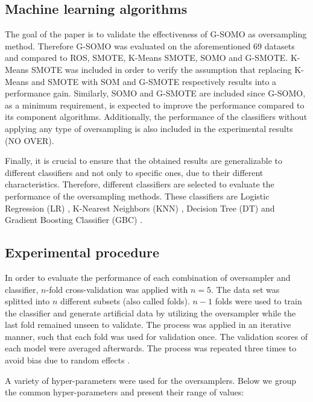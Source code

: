 \documentclass[parskip=full]{scrartcl}
\begin{document}
\subsection{Machine learning algorithms}

The goal of the paper is to validate the effectiveness of G-SOMO as oversampling method. Therefore G-SOMO was evaluated on the aforementioned 69 datasets and compared to ROS, SMOTE, K-Means SMOTE, SOMO and G-SMOTE. K-Means SMOTE was included in order to verify the assumption that replacing K-Means and SMOTE with SOM and G-SMOTE respectively results into a performance gain. Similarly, SOMO and G-SMOTE are included since G-SOMO, as a minimum requirement, is expected to improve the performance compared to its component algorithms. Additionally, the performance of the classifiers without applying any type of oversampling is also included in the experimental results (NO OVER).

Finally, it is crucial to ensure that the obtained results are generalizable to different classifiers and not only to specific ones, due to their different characteristics. Therefore, different classifiers are selected to evaluate the performance of the oversampling methods. These classifiers are Logistic Regression (LR) \cite{McCullagh1989}, K-Nearest Neighbors (KNN) \cite{Cover1967}, Decision Tree (DT) \cite{Salzberg1994} and Gradient Boosting Classifier (GBC) \cite{Friedman2001}.

\subsection{Experimental procedure}

In order to evaluate the performance of each combination of oversampler and classifier, $n$-fold cross-validation was applied with $n = 5$. The data set was splitted into $n$ different subsets (also called folds). $n-1$ folds were used to train the classifier and generate artificial data by utilizing the oversampler while the last fold remained unseen to validate. The process was applied in an iterative manner, such that each fold was used for validation once. The validation scores of each model were averaged afterwards. The process was repeated three times to avoid bias due to random effects \cite{Japkowicz2013}.

A variety of hyper-parameters were used for the oversamplers. Below we group the common hyper-parameters and present their range of values:
\end{document}
